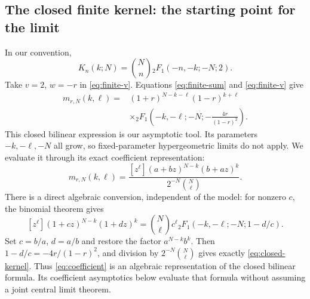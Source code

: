 \documentclass[11pt,reqno]{amsart}
\theoremstyle{remark}\newtheorem{remark}[theorem]{Remark}
\begin{document}
\subsection{The closed finite kernel: the starting point for the limit}
In our convention,
\[
K_n(k;N)=\binom Nn{}_2F_1(-n,-k;-N;2).
\]
Take $v=2$, $w=-r$ in \eqref{eq:finite-v}. Equations
\eqref{eq:finite-sum} and \eqref{eq:finite-v} give
\begin{equation}\label{eq:closed-kernel}
\boxed{\begin{aligned}
m_{r,N}(k,\ell)
={}&(1+r)^{N-k-\ell}(1-r)^{k+\ell}\\
&\times{}_2F_1\left(-k,-\ell;-N;
-\frac{4r}{(1-r)^2}\right).
\end{aligned}}
\end{equation}
This closed bilinear expression is our asymptotic tool. Its parameters
$-k,-\ell,-N$ all grow, so fixed-parameter hypergeometric limits do not
apply. We evaluate it through its exact coefficient representation:
\begin{equation}\label{eq:coefficient}
m_{r,N}(k,\ell)
=\frac{[z^\ell](a+bz)^{N-k}(b+az)^k}
{2^{-N}\binom N\ell}.
\end{equation}
There is a direct algebraic conversion, independent of the model:
for nonzero $c$, the binomial theorem gives
\[
[z^\ell](1+cz)^{N-k}(1+dz)^k
=\binom N\ell c^\ell
{}_2F_1(-k,-\ell;-N;1-d/c).
\]
Set $c=b/a$, $d=a/b$ and restore the factor $a^{N-k}b^k$.
Then $1-d/c=-4r/(1-r)^2$, and division by
$2^{-N}\binom N\ell$ gives exactly \eqref{eq:closed-kernel}.
Thus \eqref{eq:coefficient} is an algebraic representation of the
closed bilinear formula. Its coefficient asymptotics below evaluate
that formula without assuming a joint central limit theorem.
\end{document}
